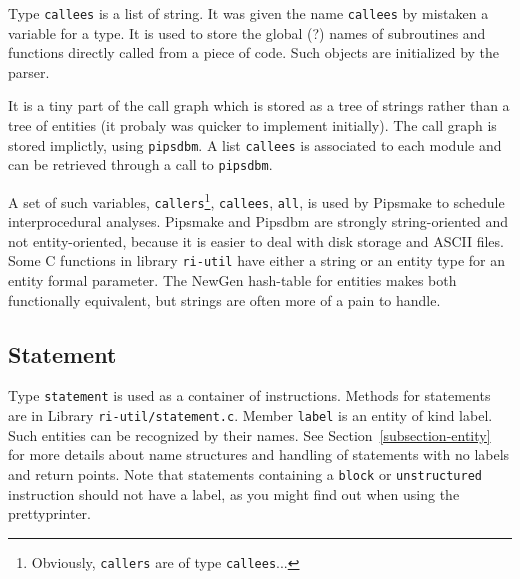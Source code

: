 \documentclass[a4paper]{article}
\begin{document}

{}

Type \texttt{callees} is a list of string. It was given the name 
\texttt{callees} by mistaken a variable for a type. It is used to store the
global (?) names of subroutines and functions directly called from a
piece of code. Such objects are initialized by the parser.

It is a tiny part of the call graph which is stored as a tree of strings
rather than a tree of entities (it probaly was quicker to implement
initially). The call graph is stored implictly, using \texttt{pipsdbm}. A
list \texttt{callees} is associated to each module and can be retrieved
through a call to \texttt{pipsdbm}.

\begin{comment}
Le domaine \texttt{callees} sert � porter des informations
interproc�durales, et sera enrichi dans le futur.  Le sous-domaine 
\texttt{callees} contient la liste des noms des sous-programmes et fonctions
directement appel�s dans le code. Il contient une partie du callgraph.
\end{comment}

A set of such variables, \verb/callers/\footnote{Obviously,
  \texttt{callers} are of type \texttt{callees}...}, \verb/callees/,
\verb/all/, is used by Pipsmake to schedule interprocedural
analyses\cite{Trio90}. Pipsmake and Pipsdbm are strongly
string-oriented and not entity-oriented, because it is easier to deal
with disk storage and ASCII files. Some C functions in library
\verb/ri-util/ have either a string or an entity type for an entity
formal parameter. The NewGen hash-table for entities makes both
functionally equivalent, but strings are often more of a pain to
handle.

\subsection{Statement}
\label{subsection-statement}

{}

Type \texttt{statement} is used as a container of instructions. Methods for
statements are in Library \texttt{ri-util/statement.c}. Member
\texttt{label} is an entity of kind label. Such entities can be recognized by
their names. See Section~\ref{subsection-entity} for more details about
name structures and handling of statements with no labels and return
points. Note that statements containing a \texttt{block} or
\texttt{unstructured} instruction should not have a label, as you might find out
when using the prettyprinter.
\end{document}
